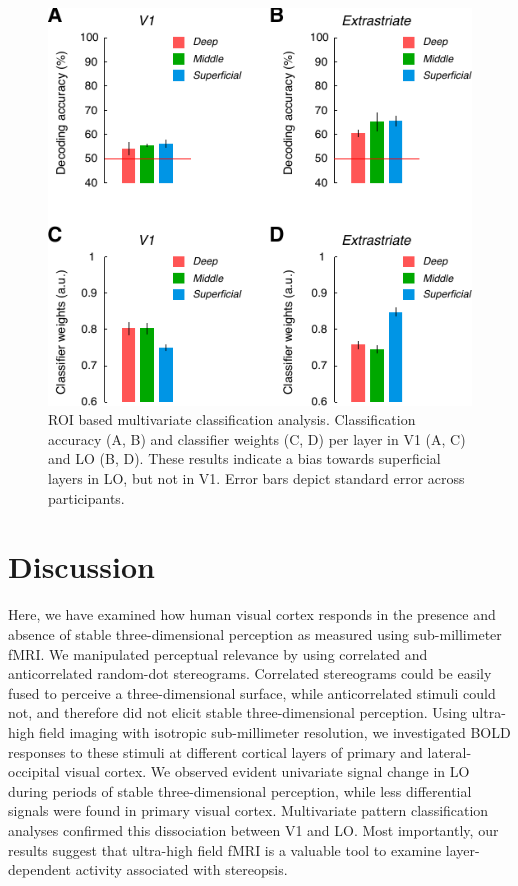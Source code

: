 \begin{figure}
  \centering
  \includegraphics[keepaspectratio]{Fig6}
  \caption[ROI based multivariate classification analysis.]{ROI based multivariate classification analysis. Classification accuracy (A, B) and classifier weights (C, D) per layer in V1 (A, C) and LO (B, D). These results indicate a bias towards superficial layers in LO, but not in V1. Error bars depict standard error across participants.}
  \label{fig:ch5fig6}
\end{figure}


\section{Discussion}

Here, we have examined how human visual cortex responds in the presence and absence of stable three-dimensional perception as measured using sub-millimeter fMRI. We manipulated perceptual relevance by using correlated and anticorrelated random-dot stereograms. Correlated stereograms could be easily fused to perceive a three-dimensional surface, while anticorrelated stimuli could not, and therefore did not elicit stable three-dimensional perception. Using ultra-high field imaging with isotropic sub-millimeter resolution, we investigated BOLD responses to these stimuli at different cortical layers of primary and lateral-occipital visual cortex. We observed evident univariate signal change in LO during periods of stable three-dimensional perception, while less differential signals were found in primary visual cortex. Multivariate pattern classification analyses confirmed this dissociation between V1 and LO. Most importantly, our results suggest that ultra-high field fMRI is a valuable tool to examine layer-dependent activity associated with stereopsis.


